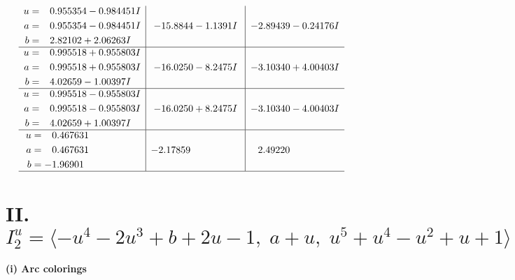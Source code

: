 \documentclass[1p]{elsarticle_modified}
\theoremstyle{definition}
\begin{document}
$$\begin{array}{c|c|c}
\begin{aligned}
u &= \phantom{-}0.955354 - 0.984451 I \\
a &= \phantom{-}0.955354 - 0.984451 I \\
b &= \phantom{-}2.82102 + 2.06263 I\end{aligned}
 & -15.8844 - 1.1391 I & -2.89439 - 0.24176 I \\ \hline\begin{aligned}
u &= \phantom{-}0.995518 + 0.955803 I \\
a &= \phantom{-}0.995518 + 0.955803 I \\
b &= \phantom{-}4.02659 - 1.00397 I\end{aligned}
 & -16.0250 - 8.2475 I & -3.10340 + 4.00403 I \\ \hline\begin{aligned}
u &= \phantom{-}0.995518 - 0.955803 I \\
a &= \phantom{-}0.995518 - 0.955803 I \\
b &= \phantom{-}4.02659 + 1.00397 I\end{aligned}
 & -16.0250 + 8.2475 I & -3.10340 - 4.00403 I \\ \hline\begin{aligned}
u &= \phantom{-}0.467631\phantom{ +0.000000I} \\
a &= \phantom{-}0.467631\phantom{ +0.000000I} \\
b &= -1.96901\phantom{ +0.000000I}\end{aligned}
 & -2.17859\phantom{ +0.000000I} & \phantom{-}2.49220\phantom{ +0.000000I}\\
 \hline 
 \end{array}$$\newpage\newpage\renewcommand{\arraystretch}{1}
\centering \section*{II. $I^u_{2}= \langle - u^4-2 u^3+b+2 u-1,\;a+u,\;u^5+u^4- u^2+u+1 \rangle$}
\flushleft \textbf{(i) Arc colorings}\\
\end{document}
